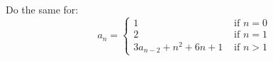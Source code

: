 Do the same for:
\[
a_n = 
\begin{cases}
1 &\text{ if } n = 0 \\
2 &\text{ if } n = 1 \\
3a_{n-2} + n^2 + 6n + 1 &\text{ if } n > 1
\end{cases}
\]
